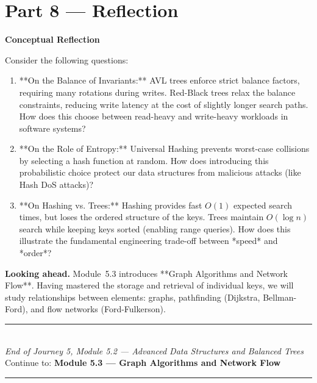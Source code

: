 \documentclass[12pt, a4paper]{book}
\begin{document}
\newpage

\section{Part 8 --- Reflection}

\begin{reflectionbox}
\textbf{Conceptual Reflection}

Consider the following questions:
\begin{enumerate}
  \item **On the Balance of Invariants:** AVL trees enforce strict balance factors, requiring many rotations during writes. Red-Black trees relax the balance constraints, reducing write latency at the cost of slightly longer search paths. How does this choose between read-heavy and write-heavy workloads in software systems?
  \item **On the Role of Entropy:** Universal Hashing prevents worst-case collisions by selecting a hash function at random. How does introducing this probabilistic choice protect our data structures from malicious attacks (like Hash DoS attacks)?
  \item **On Hashing vs. Trees:** Hashing provides fast $O(1)$ expected search times, but loses the ordered structure of the keys. Trees maintain $O(\log n)$ search while keeping keys sorted (enabling range queries). How does this illustrate the fundamental engineering trade-off between *speed* and *order*?
\end{enumerate}
\end{reflectionbox}

\medskip
\noindent\textbf{Looking ahead.}
Module~5.3 introduces **Graph Algorithms and Network Flow**. Having mastered the storage and retrieval of individual keys, we will study relationships between elements: graphs, pathfinding (Dijkstra, Bellman-Ford), and flow networks (Ford-Fulkerson).

\vspace{1.4cm}
\begin{center}
{\color{JourneyColor}\rule{0.5\linewidth}{0.8pt}}\\[6pt]
{\small\color{JourneyColor}\textit{End of Journey 5, Module 5.2 --- Advanced Data Structures and Balanced Trees}}\\[4pt]
{\small\color{JourneyColor}Continue to: \textbf{Module 5.3 --- Graph Algorithms and Network Flow}}\\[6pt]
{\color{JourneyColor}\rule{0.5\linewidth}{0.8pt}}
\end{center}
\end{document}
